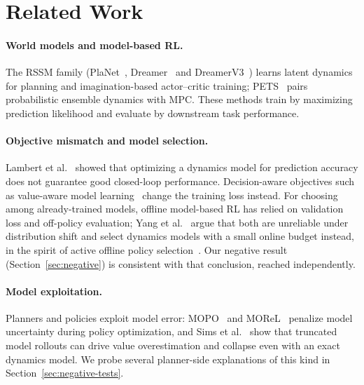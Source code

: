 \documentclass[11pt]{article}
\theoremstyle{remark}
\begin{document}
\section{Related Work}
\label{sec:related}

\paragraph{World models and model-based RL.}
The RSSM family (PlaNet~\cite{hafner2019planet}, Dreamer~\cite{hafner2020dreamer} and DreamerV3~\cite{hafner2023dreamerv3}) learns latent dynamics for planning and imagination-based actor--critic training; PETS~\cite{chua2018pets} pairs probabilistic ensemble dynamics with MPC. These methods train by maximizing prediction likelihood and evaluate by downstream task performance.

\paragraph{Objective mismatch and model selection.}
Lambert et al.~\cite{lambert2020objective} showed that optimizing a dynamics model for prediction accuracy does not guarantee good closed-loop performance. Decision-aware objectives such as value-aware model learning~\cite{farahmand2017vaml} change the training loss instead. For choosing among already-trained models, offline model-based RL has relied on validation loss and off-policy evaluation; Yang et al.~\cite{yang2026boms} argue that both are unreliable under distribution shift and select dynamics models with a small online budget instead, in the spirit of active offline policy selection~\cite{konyushova2021active}. Our negative result (Section~\ref{sec:negative}) is consistent with that conclusion, reached independently.

\paragraph{Model exploitation.}
Planners and policies exploit model error: MOPO~\cite{yu2020mopo} and MOReL~\cite{kidambi2020morel} penalize model uncertainty during policy optimization, and Sims et al.~\cite{sims2024edge} show that truncated model rollouts can drive value overestimation and collapse even with an exact dynamics model. We probe several planner-side explanations of this kind in Section~\ref{sec:negative-tests}.
\end{document}
